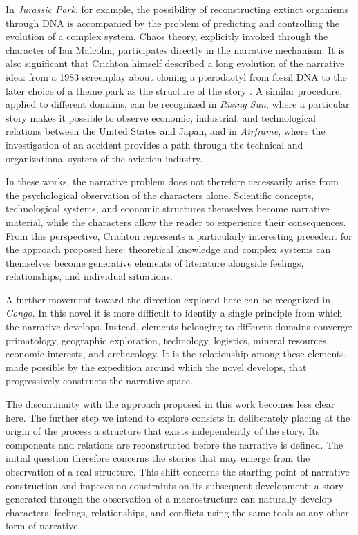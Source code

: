 \documentclass[11pt,a4paper]{article}
\begin{document}
In \emph{Jurassic Park}, for example, the possibility of reconstructing extinct organisms through DNA is accompanied by the problem of predicting and controlling the evolution of a complex system. Chaos theory, explicitly invoked through the character of Ian Malcolm, participates directly in the narrative mechanism. It is also significant that Crichton himself described a long evolution of the narrative idea: from a 1983 screenplay about cloning a pterodactyl from fossil DNA to the later choice of a theme park as the structure of the story \cite{crichtonJP}. A similar procedure, applied to different domains, can be recognized in \emph{Rising Sun}, where a particular story makes it possible to observe economic, industrial, and technological relations between the United States and Japan, and in \emph{Airframe}, where the investigation of an accident provides a path through the technical and organizational system of the aviation industry.

In these works, the narrative problem does not therefore necessarily arise from the psychological observation of the characters alone. Scientific concepts, technological systems, and economic structures themselves become narrative material, while the characters allow the reader to experience their consequences. From this perspective, Crichton represents a particularly interesting precedent for the approach proposed here: theoretical knowledge and complex systems can themselves become generative elements of literature alongside feelings, relationships, and individual situations.

A further movement toward the direction explored here can be recognized in \emph{Congo}. In this novel it is more difficult to identify a single principle from which the narrative develops. Instead, elements belonging to different domains converge: primatology, geographic exploration, technology, logistics, mineral resources, economic interests, and archaeology. It is the relationship among these elements, made possible by the expedition around which the novel develops, that progressively constructs the narrative space.

The discontinuity with the approach proposed in this work becomes less clear here. The further step we intend to explore consists in deliberately placing at the origin of the process a structure that exists independently of the story. Its components and relations are reconstructed before the narrative is defined. The initial question therefore concerns the stories that may emerge from the observation of a real structure. This shift concerns the starting point of narrative construction and imposes no constraints on its subsequent development: a story generated through the observation of a macrostructure can naturally develop characters, feelings, relationships, and conflicts using the same tools as any other form of narrative.
\end{document}
